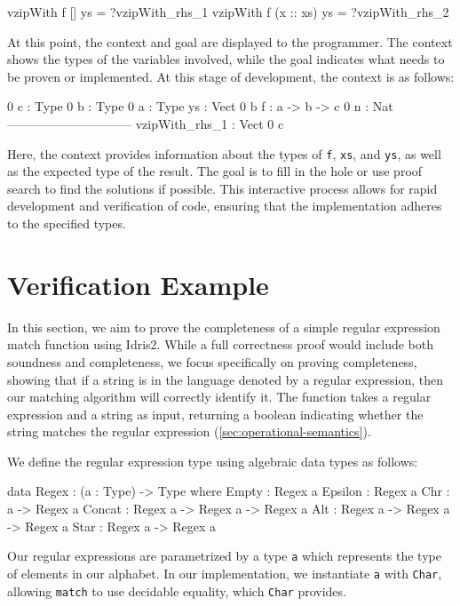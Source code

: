 \documentclass[]{rptuseminar}
\begin{document}
\begin{idris}  
vzipWith f [] ys = ?vzipWith_rhs_1
vzipWith f (x :: xs) ys = ?vzipWith_rhs_2
\end{idris}

At this point, the context and goal are displayed to the programmer. The context shows the types of the variables involved, while the goal indicates what needs to be proven or implemented. At this stage of development, the context is as follows:

\begin{idris}
 0 c  : Type
 0 b  : Type
 0 a  : Type
   ys : Vect 0 b
   f  : a -> b -> c
 0 n  : Nat
------------------------------
vzipWith_rhs_1 : Vect 0 c
\end{idris}

Here, the context provides information about the types of \texttt{f}, \texttt{xs}, and \texttt{ys}, as well as the expected type of the result. The goal is to fill in the hole or use proof search to find the solutions if possible. This interactive process allows for rapid development and verification of code, ensuring that the implementation adheres to the specified types.

\section{Verification Example}  
\label{sec:verification-example}  

In this section, we aim to prove the completeness of a simple regular expression match function using Idris2. While a full correctness proof would include both soundness and completeness, we focus specifically on proving completeness, showing that if a string is in the language denoted by a regular expression, then our matching algorithm will correctly identify it. The function takes a regular expression and a string as input, returning a boolean indicating whether the string matches the regular expression (\ref{sec:operational-semantics}).

We define the regular expression type using algebraic data types as follows:

\begin{idris}
data Regex : (a : Type) -> Type where
  Empty   : Regex a
  Epsilon : Regex a
  Chr     : a -> Regex a
  Concat  : Regex a -> Regex a -> Regex a
  Alt     : Regex a -> Regex a -> Regex a
  Star    : Regex a -> Regex a
\end{idris}

Our regular expressions are parametrized by a type \texttt{a} which represents the type of elements in our alphabet. In our implementation, we instantiate \texttt{a} with \texttt{Char}, allowing \texttt{match} to use decidable equality, which \texttt{Char} provides.
\end{document}
